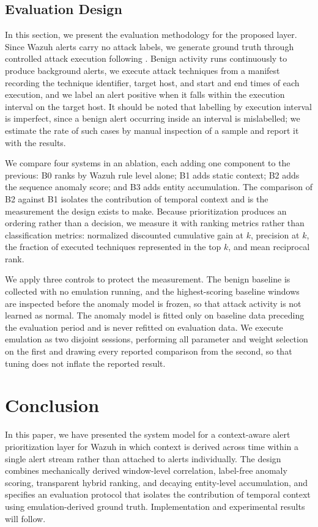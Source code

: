\documentclass[conference]{IEEEtran}
\begin{document}
\subsection{Evaluation Design}

In this section, we present the evaluation methodology for the proposed layer. Since Wazuh alerts carry no attack labels, we generate ground truth through controlled attack execution following \cite{ref12}. Benign activity runs continuously to produce background alerts, we execute attack techniques from a manifest recording the technique identifier, target host, and start and end times of each execution, and we label an alert positive when it falls within the execution interval on the target host. It should be noted that labelling by execution interval is imperfect, since a benign alert occurring inside an interval is mislabelled; we estimate the rate of such cases by manual inspection of a sample and report it with the results.

We compare four systems in an ablation, each adding one component to the previous: B0 ranks by Wazuh rule level alone; B1 adds static context; B2 adds the sequence anomaly score; and B3 adds entity accumulation. The comparison of B2 against B1 isolates the contribution of temporal context and is the measurement the design exists to make. Because prioritization produces an ordering rather than a decision, we measure it with ranking metrics rather than classification metrics: normalized discounted cumulative gain at $k$, precision at $k$, the fraction of executed techniques represented in the top $k$, and mean reciprocal rank.

We apply three controls to protect the measurement. The benign baseline is collected with no emulation running, and the highest-scoring baseline windows are inspected before the anomaly model is frozen, so that attack activity is not learned as normal. The anomaly model is fitted only on baseline data preceding the evaluation period and is never refitted on evaluation data. We execute emulation as two disjoint sessions, performing all parameter and weight selection on the first and drawing every reported comparison from the second, so that tuning does not inflate the reported result.

\section{Conclusion}

In this paper, we have presented the system model for a context-aware alert prioritization layer for Wazuh in which context is derived across time within a single alert stream rather than attached to alerts individually. The design combines mechanically derived window-level correlation, label-free anomaly scoring, transparent hybrid ranking, and decaying entity-level accumulation, and specifies an evaluation protocol that isolates the contribution of temporal context using emulation-derived ground truth. Implementation and experimental results will follow.
\end{document}
